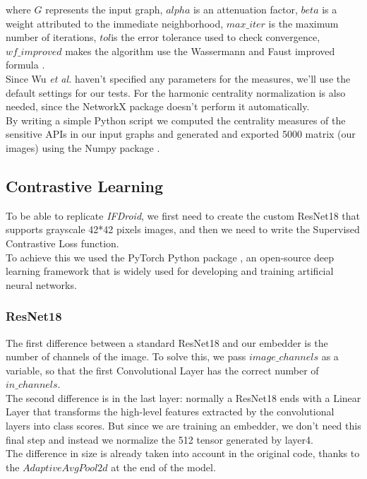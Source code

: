 \vspace{1.5pt}
\noindent where $G$ represents the input graph, $alpha$ is an attenuation factor, $beta$ is a weight attributed to the immediate neighborhood, $max\_iter$ is the maximum number of iterations, $tol$is the error tolerance used to check convergence, $wf\_improved$ makes the algorithm use the Wassermann and Faust improved formula \cite{wasserman1994social}. \\
Since Wu \textit{et al.} haven't specified any parameters for the  measures, we'll use the default settings for our tests. For the harmonic centrality normalization is also needed, since the NetworkX package doesn't perform it automatically. \\
By writing a simple Python script we computed the centrality measures of the sensitive APIs in our input graphs and generated and exported 5000 matrix (our images) using the Numpy package \cite{harris2020array}.

\subsection{Contrastive Learning}
To be able to replicate \textit{IFDroid}, we first need to create the custom ResNet18 that supports grayscale 42*42 pixels images, and then we need to write the Supervised Contrastive Loss \cite{khosla2020supervised} function. \\
To achieve this we used the PyTorch Python package \cite{paszke2019pytorch}, an open-source deep learning framework that is widely used for developing and training artificial neural networks.

\subsubsection{ResNet18}
The first difference between a standard ResNet18 and our embedder is the number of channels of the image. To solve this, we pass $image\_channels$ as a variable, so that the first Convolutional Layer has the correct number of $in\_channels$. \\
The second difference is in the last layer: normally a ResNet18 ends with a Linear Layer that transforms the high-level features extracted by the convolutional layers into class scores. But since we are training an embedder, we don't need this final step and instead we normalize the 512 tensor generated by layer4. \\
The difference in size is already taken into account in the original code, thanks to the $AdaptiveAvgPool2d$ at the end of the model. \\

